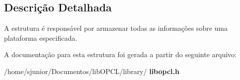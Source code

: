 \subsection{Descrição Detalhada}
A estrutura é responsável por armazenar todas as informações sobre uma plataforma especificada. 

A documentação para esta estrutura foi gerada a partir do seguinte arquivo\+:\begin{DoxyCompactItemize}
\item 
/home/sjunior/\+Documentos/lib\+O\+P\+C\+L/library/\textbf{ libopcl.\+h}\end{DoxyCompactItemize}
